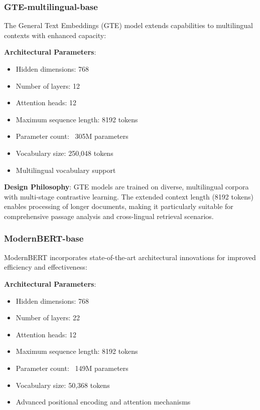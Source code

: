 \subsubsection{GTE-multilingual-base}

The General Text Embeddings (GTE) model \cite{li2023towards} extends capabilities to multilingual contexts with enhanced capacity:

\textbf{Architectural Parameters}:
\begin{itemize}
    \item Hidden dimensions: 768
    \item Number of layers: 12
    \item Attention heads: 12
    \item Maximum sequence length: 8192 tokens
    \item Parameter count: ~305M parameters
    \item Vocabulary size: 250,048 tokens
    \item Multilingual vocabulary support
\end{itemize}

\textbf{Design Philosophy}: GTE models are trained on diverse, multilingual corpora with multi-stage contrastive learning. The extended context length (8192 tokens) enables processing of longer documents, making it particularly suitable for comprehensive passage analysis and cross-lingual retrieval scenarios.

\subsubsection{ModernBERT-base}

ModernBERT \cite{modernbert} incorporates state-of-the-art architectural innovations for improved efficiency and effectiveness:

\textbf{Architectural Parameters}:
\begin{itemize}
    \item Hidden dimensions: 768
    \item Number of layers: 22
    \item Attention heads: 12
    \item Maximum sequence length: 8192 tokens
    \item Parameter count: ~149M parameters
    \item Vocabulary size: 50,368 tokens
    \item Advanced positional encoding and attention mechanisms
\end{itemize}

